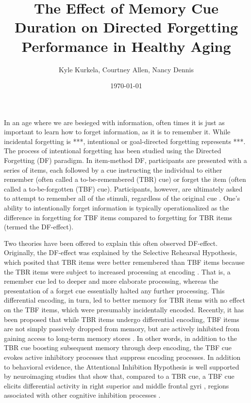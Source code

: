 \documentclass[man]{apa6}\usepackage[]{graphicx}\usepackage[]{color}
\title{The Effect of Memory Cue Duration on
Directed Forgetting Performance in Healthy Aging}
\author{Kyle Kurkela, Courtney Allen, Nancy Dennis}
\affiliation{Pennsylvania State University}
\date{\today}
\begin{document}
\maketitle


In an age where we are besieged with information, often times it is just as important to learn how to forget information, as it is to remember it. While incidental forgetting is ***, intentional or goal-directed forgetting represents ***. The process of intentional forgetting has been studied using the Directed Forgetting (DF) paradigm. In item-method DF, participants are presented with a series of items, each followed by a cue instructing the individual to either remember (often called a to-be-remembered (TBR) cue) or forget the item (often called a to-be-forgotten (TBF) cue). Participants, however, are ultimately asked to attempt to remember all of the stimuli, regardless of the original cue \parencite{bjork1970,bjork1972,bjork.woordward1973,basden1996}. One’s ability to intentionally forget information is typically operationalized as the difference in forgetting for TBF items compared to forgetting for TBR items (termed the DF-effect).

Two theories have been offered to explain this often observed DF-effect. Originally, the DF-effect was explained by the Selective Rehearsal Hypothesis, which posited that TBR items were better remembered than TBF items because the TBR items were subject to increased processing at encoding \parencite{bjork1970,paller1990,basden.badsen.Gargano1993}. That is, a remember cue led to deeper and more elaborate processing, whereas the presentation of a forget cue essentially halted any further processing. This differential encoding, in turn, led to better memory for TBR items with no effect on the TBF items, which were presumably incidentally encoded. Recently, it has been proposed that while TBR items undergo differential encoding, TBF items are not simply passively dropped from memory, but are actively inhibited from gaining access to long-term memory stores \parencite{fawcett.taylor2008,zachs.hasher1994,zacks.radvansky.hasher1996}. In other words, in addition to the TBR cue boosting subsequent memory through deep encoding, the TBF cue evokes active inhibitory processes that suppress encoding processes. In addition to behavioral evidence, the Attentional Inhibition Hypothesis is well supported by neuroimaging studies that show that, compared to a TBR cue, a TBF cue elicits differential activity in right superior and middle frontal gyri \parencite{ullsperger.mecklinger.muller2000,paz.menor.jimenez2004,wylie.foxe.taylor2008,rizio.dennis2013}, regions associated with other cognitive inhibition processes \parencite{anderson.et.al.2004,depue.curran.banich2007,benoit.anderson2012,anderson.huddleston2012,levy.anderson2012}.
\end{document}
